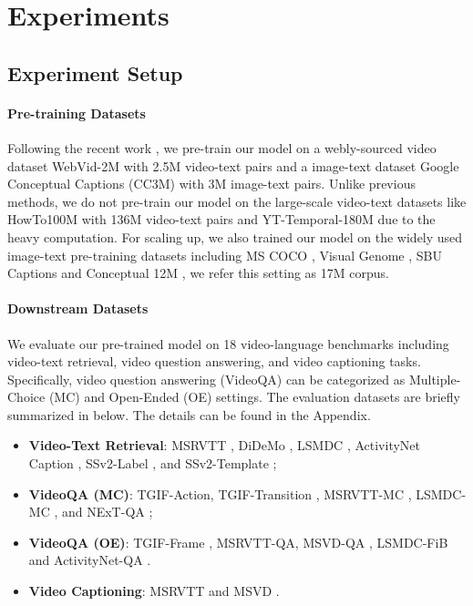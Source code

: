 \documentclass[10pt,twocolumn,letterpaper]{article}
\begin{document}
\section{Experiments}
\subsection{Experiment Setup}
\paragraph{Pre-training Datasets}
Following the recent work \cite{bain2021frozen, li2022alpro, lei2022singularity, ge2022bridgeformer, li2022lavender}, we pre-train our model on a webly-sourced video dataset WebVid-2M \cite{bain2021frozen} with 2.5M video-text pairs and a image-text dataset Google Conceptual Captions (CC3M) \cite{sharma2018conceptual} with 3M image-text pairs. Unlike previous methods, we do not pre-train our model on the large-scale video-text datasets like HowTo100M \cite{miech2020milnce} with 136M video-text pairs and YT-Temporal-180M \cite{zellers2021merlot} due to the heavy computation. For scaling up, we also trained our model on the widely used image-text pre-training datasets including MS COCO \cite{lin2014mscoco}, Visual Genome \cite{krishna2017vg}, SBU Captions \cite{ordonez2011sbu} and Conceptual 12M \cite{sharma2018conceptual}, we refer this setting as 17M corpus.


\paragraph{Downstream Datasets}
We evaluate our pre-trained model on 18 video-language benchmarks including video-text retrieval, video question answering, and video captioning tasks. Specifically, video question answering (VideoQA) can be categorized as Multiple-Choice (MC) and Open-Ended (OE) settings. The evaluation datasets are briefly summarized in below. The details can be found in the Appendix.
\begin{itemize}[leftmargin=*]\setlength{\itemsep}{-2pt}
    \item \textbf{Video-Text Retrieval}: MSRVTT \cite{xu2016msrvtt}, DiDeMo \cite{anne2017didemo}, LSMDC \cite{rohrbach2015lsmdc}, ActivityNet Caption \cite{krishna2017activitynetret}, SSv2-Label \cite{lei2022singularity}, and SSv2-Template \cite{lei2022singularity};
    \item \textbf{VideoQA (MC)}: TGIF-Action, TGIF-Transition \cite{jang2017tgif}, MSRVTT-MC \cite{yu2018msrvttmc}, LSMDC-MC \cite{torabi2016lsmdcmc}, and NExT-QA \cite{xiao2021nextqa};
    \item \textbf{VideoQA (OE)}: TGIF-Frame \cite{jang2017tgif}, MSRVTT-QA, MSVD-QA \cite{xu2017msrvttqa}, LSMDC-FiB \cite{maharaj2017lsmdcfib} and ActivityNet-QA \cite{yu2019activitynetqa}.
    \item \textbf{Video Captioning}: MSRVTT \cite{xu2016msrvtt} and MSVD \cite{chen2011msvd}.
\end{itemize}
\end{document}
